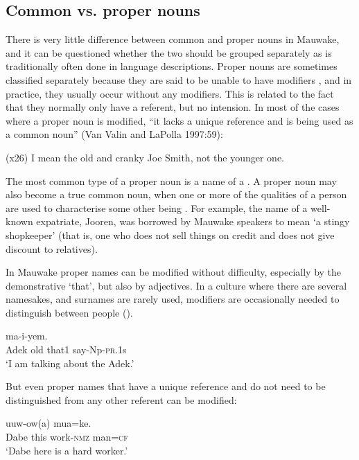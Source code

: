 \subsection{Common vs. proper nouns}
{}
There is very little difference between common and proper nouns in Mauwake, and it can be questioned whether the two should be grouped separately as is traditionally often done in language descriptions. Proper nouns are sometimes classified separately because they are said to be unable to have modifiers \citep[152]{Roberts1987}, and in practice, they usually occur without any modifiers. This is related to the fact that they normally only have a referent, but no intension. In most of the cases where a proper noun is modified, ``it lacks a unique reference and is being used as a common noun'' (Van Valin and LaPolla 1997:59):

 (x26) I mean the old and cranky Joe Smith, not the younger one. 

The most common type of a proper noun is a name of a . A proper noun may also become a true common noun, when one or more of the qualities of a person are used to characterise some other being \citep[66]{Jespersen1924}. For example, the name of a well-known expatriate, Jooren, was borrowed by Mauwake speakers to mean `a stingy shopkeeper' (that is, one who does not sell things on credit and does not give discount to relatives). 

In Mauwake proper names can be modified without difficulty, especially by the demonstrative  `that', but also by adjectives. In a culture where there are several namesakes, and surnames are rarely used, modifiers are occasionally needed to distinguish between people ().

\ea%
\label{ex:x27}
\gll {}   ma-i-yem. \\
Adek old that1 say-Np-\textsc{pr}.1s\\
\glt`I am talking about the  Adek.'
\z

But even proper names that have a unique reference and do not need to be distinguished from any other referent can be modified:

\ea%
\label{ex:x106}
\gll {}  uuw-ow(a) mua=ke. \\
Dabe this work-\textsc{nmz} man=\textsc{cf}\\
\glt`Dabe here is a hard worker.'
\z

